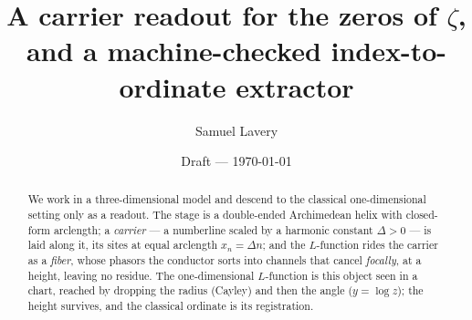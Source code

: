 \documentclass[11pt]{article}
\title{A carrier readout for the zeros of $\zeta$,\\
and a machine-checked index-to-ordinate extractor}
\author{Samuel Lavery}
\date{Draft --- \today}
\theoremstyle{plain}
\theoremstyle{definition}
\theoremstyle{remark}
\begin{document}
\maketitle

\begin{abstract}
We work in a three-dimensional model and descend to the classical one-dimensional
setting only as a readout. The stage is a double-ended Archimedean helix with
closed-form arclength; a \emph{carrier} --- a numberline scaled by a harmonic constant
$\Delta>0$ --- is laid along it, its sites at equal arclength $x_n=\Delta n$; and the
$L$-function rides the carrier as a \emph{fiber}, whose phasors the conductor sorts into
channels that cancel \emph{focally}, at a height, leaving no residue. The
one-dimensional $L$-function is this object seen in a chart, reached by dropping the
radius (Cayley) and then the angle ($y=\log z$); the height survives, and the classical
ordinate is its registration.


\end{abstract}
\end{document}
